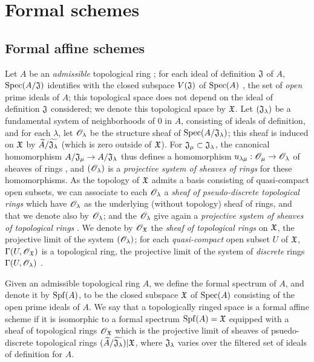 \section{Formal schemes}
\label{section-formal-schemes}

\subsection{Formal affine schemes}
\label{subsection-formal-affine-schemes}

\begin{env}[10.1.1]
\label{1.10.1.1}
Let $A$ be an \emph{admissible} topological ring ; for each ideal of definition $\mathfrak{J}$ of $A$, ${\mathop{\mathrm{Spec}}\nolimits}(A/\mathfrak{J})$ identifies with the closed subspace $V(\mathfrak{J})$ of ${\mathop{\mathrm{Spec}}\nolimits}(A)$ , the set of \emph{open} prime ideals of $A$; this topological space does not depend
on the ideal of definition $\mathfrak{J}$ considered; we denote this topological space by $\mathfrak{X}$. Let $(\mathfrak{J}_\lambda)$ be a fundamental system of neighborhoods of $0$ in $A$, consisting of ideals of definition, and for each $\lambda$, let $\mathscr{O}_\lambda$ be the structure sheaf of ${\mathop{\mathrm{Spec}}\nolimits}(A/\mathfrak{J}_\lambda)$; this sheaf is induced on $\mathfrak{X}$ by $\widetilde{A}/\widetilde{\mathfrak{J}_\lambda}$ (which is zero outside of $\mathfrak{X}$).
For $\mathfrak{J}_\mu\subset\mathfrak{J}_\lambda$, the canonical homomorphism $A/\fk{J}_\mu\to A/\fk{J}_\lambda$ thus defines a homomorphism $u_{\lambda\mu}:\OO_\mu\to\OO_\lambda$ of sheaves of rings , and $(\mathscr{O}_\lambda)$ is a \emph{projective system of sheaves of rings} for these homomorphisms.
As the topology of $\mathfrak{X}$ admits a basis consisting of quasi-compact open subsets, we can associate to each $\mathscr{O}_\lambda$ a \emph{sheaf of pseudo-discrete topological rings}  which have $\mathscr{O}_\lambda$ as the underlying (without topology) sheaf of rings, and that we denote also by $\mathscr{O}_\lambda$; and the $\mathscr{O}_\lambda$ give again a \emph{projective system of sheaves of topological rings} .
We denote by $\mathscr{O}_\mathfrak{X}$ the \emph{sheaf of topological rings} on $\mathfrak{X}$, the projective limit of the system $(\mathscr{O}_\lambda)$; for each \emph{quasi-compact} open subset $U$ of $\mathfrak{X}$, $\Gamma(U,\mathscr{O}_\mathfrak{X})$ is a topological ring, the projective limit of the system of \emph{discrete} rings $\Gamma(U,\mathscr{O}_\lambda)$ .
\end{env}

\begin{defn}[10.1.2]
\label{1.10.1.2}
Given an admissible topological ring $A$, we define the formal spectrum of $A$, and denote it by ${\mathop{\mathrm{Spf}}\nolimits}(A)$, to be the closed subspace $\mathfrak{X}$ of ${\mathop{\mathrm{Spec}}\nolimits}(A)$ consisting of the open prime ideals of $A$.
We say that a topologically ringed space is a formal affine scheme if it is isomorphic to a formal spectrum ${\mathop{\mathrm{Spf}}\nolimits}(A)=\mathfrak{X}$ equipped with a sheaf of topological rings $\mathscr{O}_\mathfrak{X}$ which is the projective limit of sheaves of psuedo-discrete topological rings $(\widetilde{A}/\widetilde{\mathfrak{J}_\lambda})|\mathfrak{X}$, where $\mathfrak{J}_\lambda$ varies over the filtered set of ideals of definition for $A$.
\end{defn}

